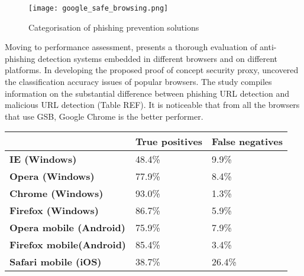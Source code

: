 \begin{figure}[t]
	\centering
	\texttt{[image: google\_safe\_browsing.png]}
	\caption{
		Categorisation of phishing prevention solutions
		\citep{ML_BASED_DETECTION_FROM_URL}}
	\label{fig:PHISHING_SOLUTION_CATEGS}
\end{figure}

Moving to performance assessment, \cite{SECURITY_BUSTERS} presents a thorough evaluation of anti-phishing detection systems embedded in different browsers and on different platforms. In developing the proposed proof of concept security proxy, \cite{SECURITY_BUSTERS} uncovered the classification accuracy issues of popular browsers. The study compiles information on the substantial difference between phishing URL detection and malicious URL detection (Table REF). It is noticeable that from all the browsers that use GSB, Google Chrome is the better performer.

\begin{singlespace}
	\begin{center}
		\label{tab:OPTIMISED_MODELS}
		\begin{tabular}{ | m{12em} | m{12em} | m{11.5em} | }
			\hline
			                                 & \textbf{True positives} & \textbf{False negatives} \\
			\hline
			\textbf{IE (Windows)}            & 48.4\%                  & 9.9\%                    \\
			\hline
			\textbf{Opera (Windows)}         & 77.9\%                   & 8.4\%                    \\
			\hline
			\textbf{Chrome (Windows)}        & 93.0\%                   & 1.3\%                    \\
			\hline
			\textbf{Firefox (Windows)}       & 86.7\%                   & 5.9\%                    \\
			\hline
			\textbf{Opera mobile (Android)}  & 75.9\%                   & 7.9\%                    \\
			\hline
			\textbf{Firefox mobile(Android)} & 85.4\%                   & 3.4\%                    \\
			\hline
			\textbf{Safari mobile (iOS)}     & 38.7\%                   & 26.4\%                    \\
			\hline
		\end{tabular}
		\captionsetup{type=table}\caption{A comparison of existing solutions (The missing percentages mark phishes that went offline during testing) \citep{INTELLIGENT_PHISHING_ANFIS}}
	\end{center}
\end{singlespace}


